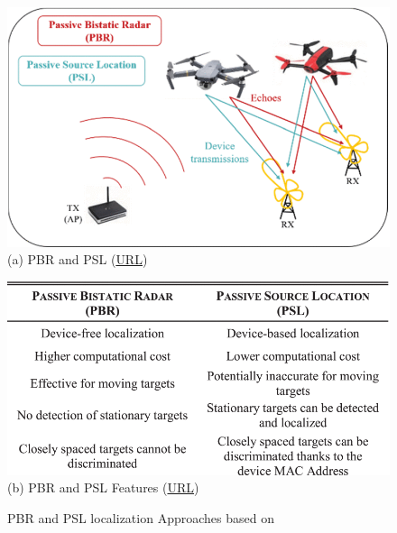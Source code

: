 \begin{figure} [H]
	\centering
		\begin{minipage}{.48\textwidth}
			\centering
			\includegraphics[width=\linewidth]{Images/Related-Work/PBR-and-PSL-approaches.png}
			{(a) PBR and PSL (\href{https://ieeexplore.ieee.org/document/9253794/figures#figures}{URL})}
		\end{minipage}%
		\hspace*{+1cm}
		\begin{minipage}{.48\textwidth}
			\centering
			\includegraphics[width=\linewidth]{Images/Related-Work/PBR-and-PSL-Features.png}
			{(b) PBR and PSL Features (\href{https://ieeexplore.ieee.org/document/9253794/figures#figures}{URL})}
		\end{minipage}
    \hfill \break
    \decoRule
    \caption[PBR and PSL localization Approaches]{PBR and PSL localization Approaches based on \cite{wifi-passive-active-drone-localization}}
    \label{fig:PBR-and-PSL}
\end{figure}

